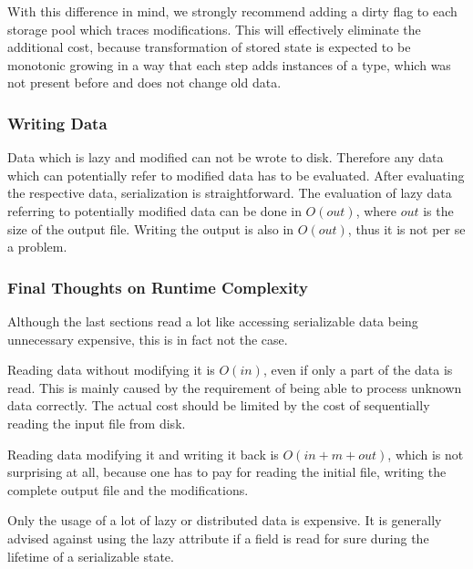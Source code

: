 With this difference in mind, we strongly recommend adding a dirty flag to each storage pool which traces modifications. This will effectively eliminate the additional cost, because transformation of stored state is expected to be monotonic growing in a way that each step adds instances of a type, which was not present before and does not change old data.


\subsubsection{Writing Data}

Data which is lazy and modified can not be wrote to disk. Therefore any data which can potentially refer to modified data has to be evaluated. After evaluating the respective data, serialization is straightforward. The evaluation of lazy data referring to potentially modified data can be done in $O(out)$, where $out$ is the size of the output file. Writing the output is also in $O(out)$, thus it is not per se a problem.


\subsubsection{Final Thoughts on Runtime Complexity}

Although the last sections read a lot like accessing serializable data being unnecessary expensive, this is in fact not the case.

Reading data without modifying it is $O(in)$, even if only a part of the data is read. This is mainly caused by the requirement of being able to process unknown data correctly. The actual cost should be limited by the cost of sequentially reading the input file from disk.

Reading data modifying it and writing it back is $O(in + m + out)$, which is not surprising at all, because one has to pay for reading the initial file, writing the complete output file and the modifications.

Only the usage of a lot of lazy or distributed data is expensive. It is generally advised against using the lazy attribute if a field is read for sure during the lifetime of a serializable state.
